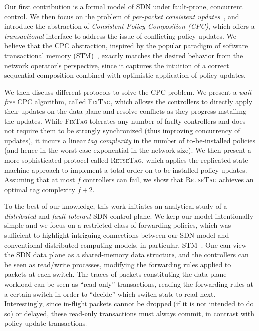 \documentclass[11pt,pdftex,letter]{article}
\newcommand{\CPO}{\textsc{FixTag}}
\newcommand{\DPO}{\textsc{ReuseTag}}
\newcommand{\smartparagraph}[1]{\noindent{\bf #1}\ }
\newcommand{\mcnote}[1]{\textcolor{heraldBlue}{\small \bf [MC: #1]}}
\newcommand{\mcnote}[1]{}
\begin{document}
Our first contribution is a formal model
of SDN under fault-prone, concurrent control.
We then focus on the problem of
\emph{per-packet consistent updates}~\cite{network-update}, and introduce the
abstraction of \emph{Consistent Policy Composition (CPC)}, which offers a
\emph{transactional} interface to address the issue of conflicting policy
updates. We believe that the CPC abstraction, inspired by the popular paradigm
of software transactional memory (STM)~\cite{stm-st95}, exactly matches the
desired behavior from the network operator's perspective, since it captures
the intuition of a correct sequential composition combined with optimistic
application of policy updates.

We then discuss different protocols to solve the CPC problem.
We present a \emph{wait-free} CPC algorithm, called {\CPO},
which allows the controllers to directly apply their updates on the
data plane and resolve conflicts as they progress installing the updates.
While {\CPO} tolerates any number of faulty
controllers 
and does not require them to be strongly synchronized
(thus improving concurrency of updates),
it incurs a linear \emph{tag complexity} in the number of to-be-installed policies (and hence in the worst-case
 exponential in the network size).
We then present a more sophisticated protocol called {\DPO}, which
applies the replicated state-machine approach to implement
a total order on to-be-installed 
policy updates.
Assuming that at most $f$ controllers can fail, we show that {\DPO}
achieves an optimal tag complexity $f+2$.

To the best of our knowledge, this work initiates
an analytical study of a \emph{distributed} and \emph{fault-tolerant} SDN control plane.
We keep our model intentionally simple
and we  focus on a restricted class of forwarding
policies, which was sufficient to highlight
intriguing connections between our SDN model and conventional
distributed-computing models, in particular, STM~\cite{stm-st95}.
One can view the SDN data plane as a shared-memory data
structure, and the controllers can be seen as read/write processes,
modifying the forwarding rules applied to packets at each switch.
The traces of packets constituting the data-plane workload can be seen as
``read-only'' transactions, reading the
forwarding rules at a certain switch in order to ``decide'' which switch state to read
next.
Interestingly, since in-flight packets cannot be dropped (if it is not intended to do so) or delayed, these
read-only transactions must always commit, in contrast with policy update transactions.
\end{document}
